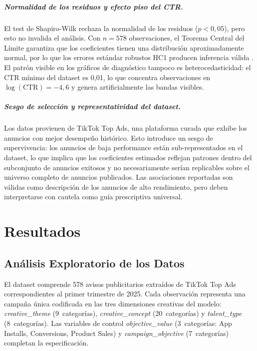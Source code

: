 \documentclass[12pt, a4paper]{report}
\begin{document}
\paragraph{Normalidad de los residuos y efecto piso del CTR.}
El test de Shapiro-Wilk rechaza la normalidad de los residuos ($p < 0{,}05$), pero
esto no invalida el análisis. Con $n = 578$ observaciones, el Teorema Central del
Límite garantiza que los coeficientes tienen una distribución aproximadamente normal,
por lo que los errores estándar robustos HC1 producen inferencia válida
\citep{white1980}. El patrón visible en los gráficos de diagnóstico tampoco es
heterocedasticidad: el CTR mínimo del dataset es 0{,}01, lo que concentra
observaciones en $\log(\text{CTR}) = -4{,}6$ y genera artificialmente las bandas
visibles.

\paragraph{Sesgo de selección y representatividad del dataset.}
Los datos provienen de TikTok Top Ads, una plataforma curada que exhibe los anuncios
con mejor desempeño histórico. Esto introduce un sesgo de supervivencia: los anuncios
de baja performance están sub-representados en el dataset, lo que implica que los
coeficientes estimados reflejan patrones dentro del subconjunto de anuncios exitosos
y no necesariamente serían replicables sobre el universo completo de anuncios publicados.
Las asociaciones reportadas son válidas como descripción de los anuncios de alto
rendimiento, pero deben interpretarse con cautela como guía prescriptiva universal.

\chapter{Resultados}

\section{Análisis Exploratorio de los Datos}

El dataset comprende 578 avisos publicitarios extraídos de TikTok Top Ads
correspondientes al primer trimestre de 2025. Cada observación representa
una campaña única codificada en las tres dimensiones creativas del modelo:
\textit{creative\_theme} (9~categorías), \textit{creative\_concept}
(20~categorías) y \textit{talent\_type} (8~categorías). Las variables de control \textit{objective\_value}
(3~categorías: App Installs, Conversions, Product Sales) y
\textit{campaign\_objective} (7~categorías) completan la especificación.
\end{document}

